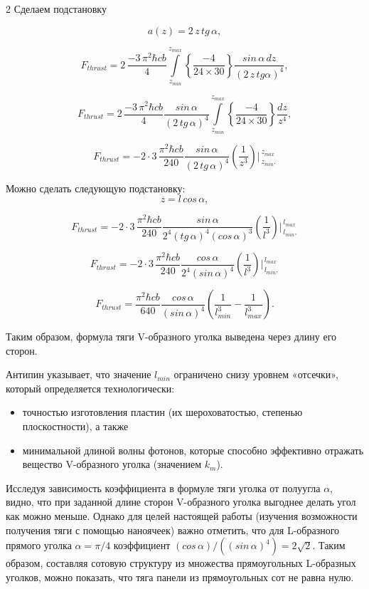 \documentclass[twoside, 10pt]{article}
\begin{document}
\begin{multicols}{2}
Сделаем подстановку

\[a\left(z\right) = 2\,z\,tg\, \alpha,\]

\[F_{thrust} = 2\, \frac{-3\,\pi^2\hbar c b}{4}\int\limits_{z_{min}}^{z_{max}} \left\{\frac{-4}{24\times30}\right\}\frac{sin\, \alpha\,dz}{\left(2\,z\,tg \alpha\right)^4},\]

\[F_{thrust} = 2\, \frac{-3\,\pi^2\hbar c b}{4} \frac{sin\, \alpha}{\left(2\,tg\, \alpha\right)^4} \int\limits_{z_{min}}^{z_{max}} \left\{\frac{-4}{24\times30}\right\} \frac{dz}{z^4},\]

\[F_{thrust} = -2\cdot3\, \frac{\pi^2\hbar c b}{240} \frac{sin\, \alpha}{\left(2\,tg\, \alpha\right)^4} \left(\frac{1}{z^3}\right)\Bigg\rvert_{\,z_{min}.}^{\,z_{max}} \]

    Можно сделать следующую подстановку: \[z = l\, cos\, \alpha,\]

\[F_{thrust} = -2\cdot3\, \frac{\pi^2\hbar c b}{240} \frac{sin\, \alpha}{2^4\left(tg\,\alpha\right)^4\left(cos\, \alpha\right)^3} \left(\frac{1}{l^3}\right)\Bigg\rvert_{\,l_{min},}^{\,l_{max}} \]

\[F_{thrust} = -2\cdot3\, \frac{\pi^2\hbar c b}{240} \frac{cos\, \alpha}{2^4\left(sin\, \alpha\right)^4} \left(\frac{1}{l^3}\right)\Bigg\rvert_{\,l_{min},}^{\,l_{max}} \]

\noindent
\begin{equation}F_{thrust} = \frac{\pi^2\hbar c b}{640} \frac{cos\, \alpha}{\left(sin\, \alpha\right)^4} \left(\frac{1}{l_{min}^3} - \frac{1}{l_{max}^3}\right).\end{equation}

Таким образом, формула тяги \mbox{V-образного} уголка выведена через длину его сторон.

Антипин указывает, что значение \(l_{min}\) ограничено снизу уровнем «отсечки», который определяется технологически:

\begin{itemize}
\item
  точностью изготовления пластин (их шероховатостью, степенью плоскостности), а также
\item
  минимальной длиной волны фотонов, которые способно эффективно отражать вещество \mbox{V-образного} уголка (значением \(k_m\)).
\end{itemize}

    Исследуя зависимость коэффициента в формуле тяги уголка от полуугла \(\alpha\), видно, что при заданной длине сторон \mbox{V-образного} уголка выгоднее делать угол как можно меньше. Однако для целей настоящей работы (изучения возможности получения тяги с помощью наноячеек) важно отметить, что для \mbox{L-образного} прямого уголка \(\alpha = {\pi}/{4}\) коэффициент
\(\left({cos\, \alpha}\right)\big/\left({\left(sin\, \alpha\right)^4}\right) = 2\sqrt{2}\).
Таким образом, составляя сотовую структуру из множества прямоугольных \mbox{L-образных} уголков, можно показать, что тяга панели из прямоугольных сот не равна нулю.


\end{multicols}
\end{document}
